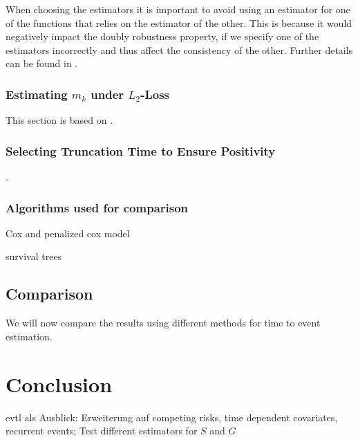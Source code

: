 \documentclass[12pt, a4paper]{article}
\theoremstyle{definition}
\theoremstyle{plain}
\numberwithin{equation}{section}
\numberwithin{figure}{section}
\numberwithin{table}{section}
\begin{document}
	When choosing the estimators it is important to avoid using an estimator for one of the functions that relies on the estimator of the other.
	This is because it would negatively impact the doubly robustness property, if we specify one of the estimators incorrectly and thus affect the consistency of the other.
	Further details can be found in \citet*{drtrees}.
	
	\subsubsection{Estimating $m_k$ under $L_2$-Loss}
	
	This section is based on \citet*{drtrees}.
	
	\subsubsection{Selecting Truncation Time to Ensure Positivity}
	
	\citet*{drtrees}.
	
	\subsubsection{Algorithms used for comparison}
	
	Cox and penalized cox model
	
	survival trees
	
	\subsection{Comparison}
	We will now compare the results using different methods for time to event estimation.
	

	\newpage
	\section{Conclusion}
	
	evtl als Ausblick: Erweiterung auf competing risks, time dependent covariates, recurrent events; Test different estimators for $S$ and $G$
	
	\newpage
	
	\thispagestyle{empty}
	
	
	
	\newpage
	
\end{document}
